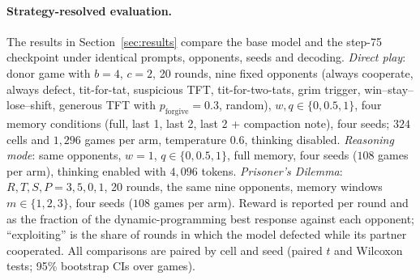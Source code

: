 \documentclass{article}
\begin{document}
\paragraph{Strategy-resolved evaluation.} The results in
Section~\ref{sec:results} compare the base model and the step-75 checkpoint
under identical prompts, opponents, seeds and decoding. \emph{Direct play}:
donor game with $b=4$, $c=2$, 20 rounds, nine fixed opponents (always
cooperate, always defect, tit-for-tat, suspicious TFT, tit-for-two-tats, grim
trigger, win--stay--lose--shift, generous TFT with $p_{\mathrm{forgive}}=0.3$,
random), $w,q\in\{0,0.5,1\}$, four memory conditions (full, last 1, last 2,
last 2 + compaction note), four seeds; $324$ cells and $1{,}296$ games per
arm, temperature $0.6$, thinking disabled. \emph{Reasoning mode}: same
opponents, $w=1$, $q\in\{0,0.5,1\}$, full memory, four seeds ($108$ games
per arm), thinking enabled with $4{,}096$ tokens. \emph{Prisoner's Dilemma}:
$R,T,S,P=3,5,0,1$, 20 rounds, the same nine opponents, memory windows
$m\in\{1,2,3\}$, four seeds ($108$ games per arm). Reward is reported per
round and as the fraction of the dynamic-programming best response against
each opponent; ``exploiting'' is the share of rounds in which the model
defected while its partner cooperated. All comparisons are paired by cell and
seed (paired $t$ and Wilcoxon tests; 95\% bootstrap CIs over games).
\end{document}
